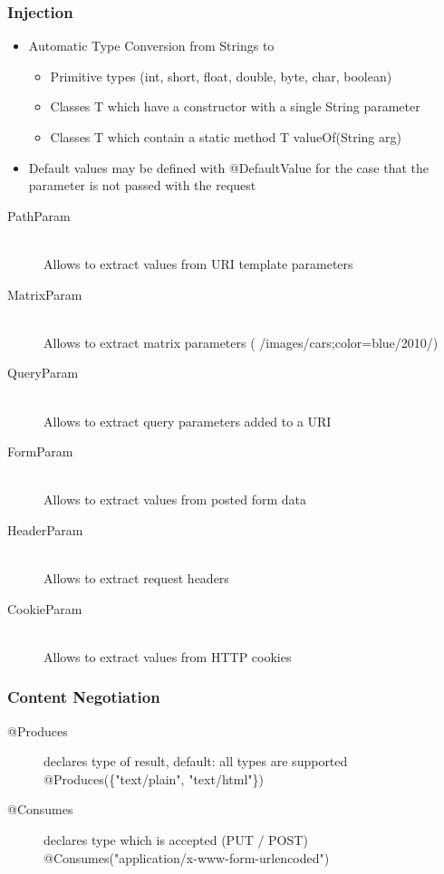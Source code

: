 \documentclass[10pt]{article}
\begin{document}
\subsubsection{Injection}
\begin{itemize}
	\item Automatic Type Conversion from Strings to
	\begin{itemize}
		\item Primitive types (int, short, float, double, byte, char, boolean)
		\item Classes T which have a constructor with a single String parameter
		\item Classes T which contain a static method T valueOf(String arg)
	\end{itemize}
	\item Default values may be defined with @DefaultValue for the case that the parameter is not passed with the request
\end{itemize}
\begin{description}
	\item[PathParam] \hfill \\
		Allows to extract values from URI template parameters
	\item[MatrixParam] \hfill \\
		Allows to extract matrix parameters ( /images/cars;color=blue/2010/)
	\item[QueryParam] \hfill \\
		Allows to extract query parameters added to a URI
	\item[FormParam] \hfill \\
		Allows to extract values from posted form data
	\item[HeaderParam] \hfill \\
		Allows to extract request headers
	\item[CookieParam] \hfill \\
		Allows to extract values from HTTP cookies
\end{description}
\subsubsection{Content Negotiation}
\begin{description}
	\item[@Produces] declares type of result, default: all types are supported \\
		@Produces(\{"{}text/plain", "{}text/html"\})
	\item[@Consumes] declares type which is accepted (PUT / POST) \\
		@Consumes("{}application/x-www-form-urlencoded")
\end{description}
\end{document}
